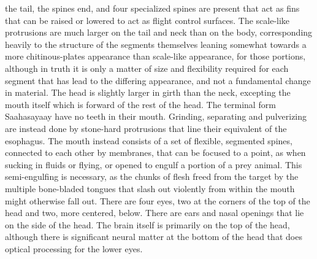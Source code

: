 the tail, the spines end, and four specialized spines are present that
act as fins that can be raised or lowered to act as flight control
surfaces. The scale-like protrusions are much larger on the tail and
neck than on the body, corresponding heavily to the structure of the
segments themselves leaning somewhat towards a more chitinous-plates
appearance than scale-like appearance, for those portions, although in
truth it is only a matter of size and flexibility required for each
segment that has lead to the differing appearance, and not a
fundamental change in material. The head is slightly larger in girth
than the neck, excepting the mouth itself which is forward of the rest
of the head. The terminal form Saahasayaay have no teeth in their
mouth. Grinding, separating and pulverizing are instead done by
stone-hard protrusions that line their equivalent of the
esophagus. The mouth instead consists of a set of flexible, segmented
spines, connected to each other by membranes, that can be focused to a
point, as when sucking in fluids or flying, or opened to engulf a
portion of a prey animal. This semi-engulfing is necessary, as the
chunks of flesh freed from the target by the multiple bone-bladed
tongues that slash out violently from within the mouth might otherwise
fall out. There are four eyes, two at the corners of the top of the
head and two, more centered, below. There are ears and nasal openings
that lie on the side of the head. The brain itself is primarily on the
top of the head, although there is significant neural matter at the
bottom of the head that does optical processing for the lower eyes.

